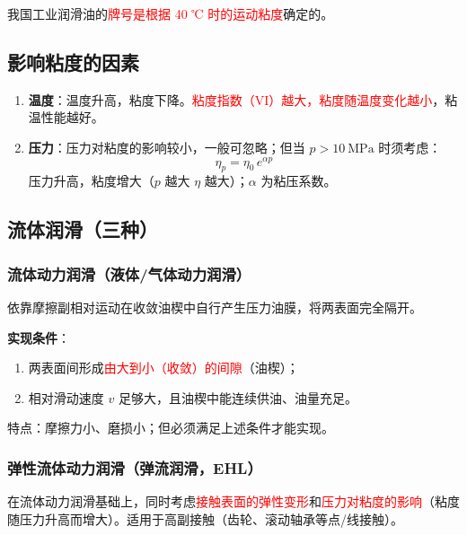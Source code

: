\begin{keybox}[润滑油牌号]
我国工业润滑油的\textcolor{red}{牌号是根据 40 ℃ 时的运动粘度}确定的。
\end{keybox}

\subsection{影响粘度的因素}

\begin{definition}[温度与压力对粘度的影响]
\label{def:影响粘度因素}
\begin{enumerate}
	\item \textbf{温度}：温度升高，粘度下降。\textcolor{red}{粘度指数（VI）越大，粘度随温度变化越小}，粘温性能越好。
	\item \textbf{压力}：压力对粘度的影响较小，一般可忽略；但当 $p>10\ \mathrm{MPa}$ 时须考虑：
	\begin{equation}
		\eta_p=\eta_0\,e^{\alpha p}
		\label{eq:润滑:粘压关系}
	\end{equation}
	压力升高，粘度增大（$p$ 越大 $\eta$ 越大）；$\alpha$ 为粘压系数。
\end{enumerate}
\end{definition}

\subsection{流体润滑（三种）}

\subsubsection{流体动力润滑（液体/气体动力润滑）}
\begin{definition}[流体动力润滑]
\label{def:流体动力润滑}
依靠摩擦副相对运动在收敛油楔中自行产生压力油膜，将两表面完全隔开。

\textbf{实现条件}：
\begin{enumerate}
	\item 两表面间形成\textcolor{red}{由大到小（收敛）的间隙}（油楔）；
	\item 相对滑动速度 $v$ 足够大，且油楔中能连续供油、油量充足。
\end{enumerate}
特点：摩擦力小、磨损小；但必须满足上述条件才能实现。
\end{definition}

\subsubsection{弹性流体动力润滑（弹流润滑，EHL）}
\begin{definition}[弹性流体动力润滑]
\label{def:弹性流体动力润滑}
在流体动力润滑基础上，同时考虑\textcolor{red}{接触表面的弹性变形}和\textcolor{red}{压力对粘度的影响}（粘度随压力升高而增大）。适用于高副接触（齿轮、滚动轴承等点/线接触）。
\end{definition}

